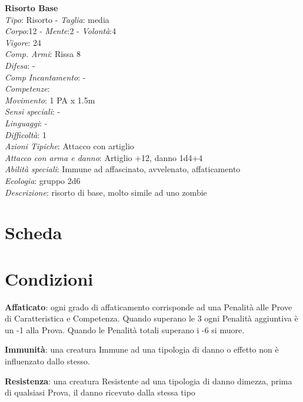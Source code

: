 \documentclass[12pt,a4paper,twoside,openany]{book}
\begin{document}
\begin{multicols}{2}
\textbf{Risorto Base}\\
\textit{Tipo}: Risorto - \textit{Taglia}: media\\
\textit{Corpo}:12 - \textit{Mente}:2 - \textit{Volontà}:4\\
\textit{Vigore}:  24 \\ %
\textit{Comp. Armi}: Rissa 8\\
\textit{Difesa}: -\\
\textit{Comp Incantamento}: -\\
\textit{Competenze}: \\
\textit{Movimento}: 1 PA x 1.5m\\
\textit{Sensi speciali}: -\\
\textit{Linguaggi}: -\\
\textit{Difficoltà}: 1\\
\textit{Azioni Tipiche}: Attacco con artiglio\\
\textit{Attacco con arma e danno}: Artiglio +12, danno 1d4+4\\
\textit{Abilità speciali}: Immune ad affascinato, avvelenato, affaticamento\\
\textit{Ecologia}: gruppo 2d6\\
\textit{Descrizione}: risorto di base, molto simile ad uno zombie\\

\end{multicols}

\pagebreak

\section{Scheda}

\pagebreak

\section{Condizioni}

\textbf{Affaticato}: ogni grado di affaticamento corrisponde ad una Penalità alle Prove di Caratteristica e Competenza. Quando superano le 3 ogni Penalità aggiuntiva è un -1 alla Prova.
Quando le Penalità totali superano i -6 si muore.

\textbf{Immunità}: una creatura Immune ad una tipologia di danno o effetto non è influenzato dallo stesso.

\textbf{Resistenza}: una creatura Resistente ad una tipologia di danno dimezza, prima di qualsiasi Prova, il danno ricevuto dalla stessa tipo 
\end{document}

